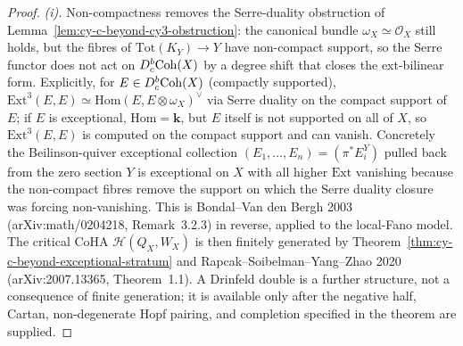 \begin{proof}
\emph{(i).} Non-compactness removes the Serre-duality obstruction
of Lemma~\ref{lem:cy-c-beyond-cy3-obstruction}: the canonical
bundle $\omega_X \simeq \mathcal O_X$ still holds, but the fibres
of $\mathrm{Tot}(K_Y) \to Y$ have non-compact support, so the
Serre functor does not act on $D^b_c\mathrm{Coh}(X)$ by a degree shift
that closes the ext-bilinear form. Explicitly, for $E \in
D^b_c\mathrm{Coh}(X)$ (compactly supported), $\mathrm{Ext}^3(E, E) \simeq
\mathrm{Hom}(E, E \otimes \omega_X)^\vee$ via Serre duality on
the compact support of $E$; if $E$ is exceptional, $\mathrm{Hom}
= \mathbf k$, but $E$ itself is not supported on all of $X$, so
$\mathrm{Ext}^3(E, E)$ is computed on the compact support and can
vanish. Concretely the Beilinson-quiver exceptional collection
$(E_1, \ldots, E_n) = (\pi^* E_i^Y)$ pulled back from the zero
section $Y$ is exceptional on $X$ with all higher $\mathrm{Ext}$
vanishing because the non-compact fibres remove the support on
which the Serre duality closure was forcing non-vanishing. This
is Bondal--Van den Bergh 2003 (arXiv:math/0204218, Remark~3.2.3)
in reverse, applied to the local-Fano model. The critical CoHA
$\mathcal H(Q_X, W_X)$ is then finitely generated by
Theorem~\ref{thm:cy-c-beyond-exceptional-stratum} and
Rapcak--Soibelman--Yang--Zhao 2020 (arXiv:2007.13365,
Theorem~1.1). A Drinfeld double is a further structure, not a
consequence of finite generation; it is available only after the
negative half, Cartan, non-degenerate Hopf pairing, and completion
specified in the theorem are supplied.


\end{proof}
